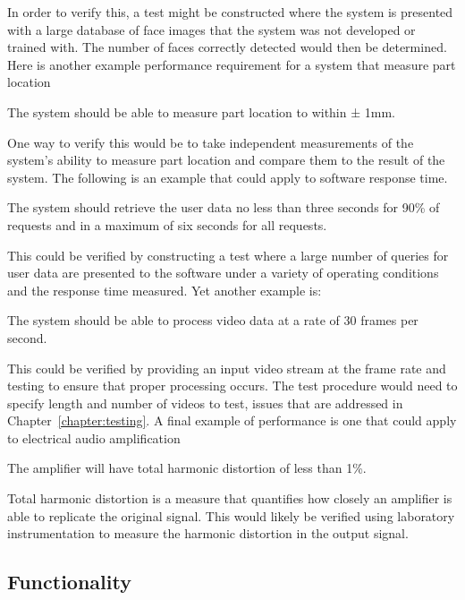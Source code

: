 In order to verify this, a test might be constructed where the system is
presented with a large database of face images that the system was not
developed or trained with. The number of faces correctly detected would
then be determined. Here is another example performance requirement for
a system that measure part location

\begin{itquote}
The system should be able to measure part location to within ± 1mm.
\end{itquote}

One way to verify this would be to take independent measurements of the
system's ability to measure part location and compare them to the result
of the system. The following is an example that could apply to software
response time.

\begin{itquote}
The system should retrieve the user data no less than three seconds for
90\% of requests and in a maximum of six seconds for all requests.
\end{itquote}

This could be verified by constructing a test where a large number of
queries for user data are presented to the software under a variety of
operating conditions and the response time measured. Yet another example
is:
\begin{itquote}
The system should be able to process video data at a rate of 30 frames
per second.
\end{itquote}

This could be verified by providing an input video stream at the frame
rate and testing to ensure that proper processing occurs. The test
procedure would need to specify length and number of videos to test,
issues that are addressed in Chapter~\ref{chapter:testing}. 
A final example of performance
is one that could apply to electrical audio amplification

\begin{itquote}
The amplifier will have total harmonic distortion of less than 1\%.
\end{itquote}

Total harmonic distortion is a measure that quantifies how closely an
amplifier is able to replicate the original signal. This would likely be
verified using laboratory instrumentation to measure the harmonic
distortion in the output signal.


\subsection*{Functionality}
\label{subsection:functionality}

